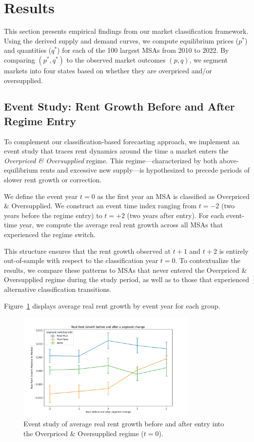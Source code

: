\documentclass[sn-mathphys-num]{sn-jnl}%
\begin{document}
\begin{center}
\end{center}


\section*{Results}

This section presents empirical findings from our market classification framework. Using the derived supply and demand curves, we compute equilibrium prices (\( p^* \)) and quantities (\( q^* \)) for each of the 100 largest MSAs from 2010 to 2022. By comparing \( (p^*, q^*) \) to the observed market outcomes \( (p, q) \), we segment markets into four states based on whether they are overpriced and/or oversupplied.

\subsection*{Event Study: Rent Growth Before and After Regime Entry}

To complement our classification-based forecasting approach, we implement an event study that traces rent dynamics around the time a market enters the \emph{Overpriced \& Oversupplied} regime. This regime—characterized by both above-equilibrium rents and excessive new supply—is hypothesized to precede periods of slower rent growth or correction.

We define the event year $t=0$ as the first year an MSA is classified as Overpriced \& Oversupplied. We construct an event time index ranging from $t = -2$ (two years before the regime entry) to $t = +2$ (two years after entry). For each event-time year, we compute the average real rent growth across all MSAs that experienced the regime switch.

This structure ensures that the rent growth observed at $t+1$ and $t+2$ is entirely out-of-sample with respect to the classification year $t=0$. To contextualize the results, we compare these patterns to MSAs that never entered the Overpriced \& Oversupplied regime during the study period, as well as to those that experienced alternative classification transitions.

Figure~\ref{fig:event_study} displays average real rent growth by event year for each group.

\begin{figure}[H]
	\centering
	\includegraphics[width=0.8\textwidth]{event_study.png}
	\caption*{Event study of average real rent growth before and after entry into the Overpriced \& Oversupplied regime ($t=0$).}
	\label{fig:event_study}
\end{figure}
\end{document}
